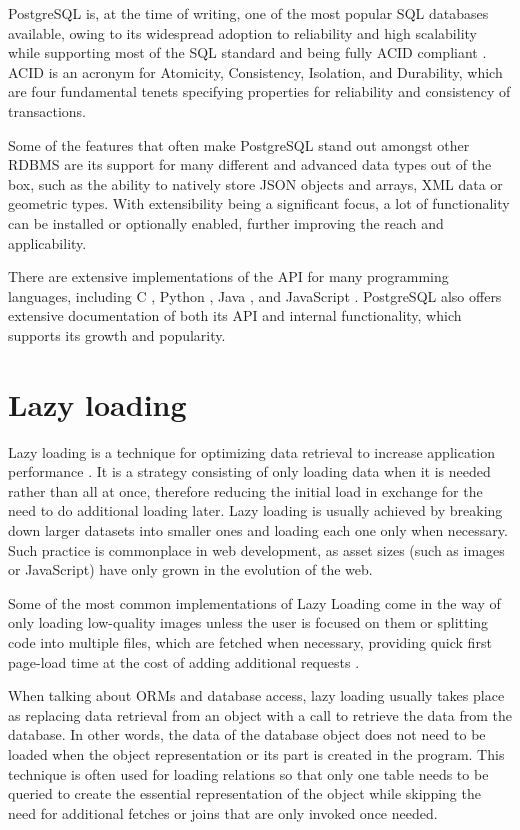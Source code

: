 PostgreSQL is, at the time of writing, one of the most popular SQL databases
available, owing to its widespread adoption to reliability and high scalability
while supporting most of the SQL standard and being fully ACID compliant
\cite{postgres-transaction}. ACID is an acronym for Atomicity, Consistency,
Isolation, and Durability, which are four fundamental tenets specifying
properties for reliability and consistency of transactions.

Some of the features that often make PostgreSQL stand out amongst other RDBMS
are its support for many different and advanced data types
\cite{postgres-datatypes} out of the box, such as the ability to natively store
JSON objects and arrays, XML data or geometric types. With extensibility being a
significant focus, a lot of functionality can be installed or optionally
enabled, further improving the reach and applicability.

There are extensive implementations of the API for many programming languages,
including C \cite{libpq}, Python \cite{psycopg2}, Java \cite{pgJDBC}, and
JavaScript \cite{node-postgres}. PostgreSQL also offers extensive documentation
of both its API and internal functionality, which supports its growth and
popularity.

\section*{Lazy loading}
Lazy loading is a technique for optimizing data retrieval to increase
application performance \cite{webPerformanceMDN}. It is a strategy consisting of
only loading data when it is needed rather than all at once, therefore reducing
the initial load in exchange for the need to do additional loading later. Lazy
loading is usually achieved by breaking down larger datasets into smaller ones
and loading each one only when necessary. Such practice is commonplace in web
development, as asset sizes (such as images or JavaScript) have only grown in
the evolution of the web.

Some of the most common implementations of Lazy Loading come in the way of only
loading low-quality images unless the user is focused on them or splitting code
into multiple files, which are fetched when necessary, providing quick first
page-load time at the cost of adding additional requests
\cite[p.~200]{fowler-patterns-2003}.

When talking about ORMs and database access, lazy loading usually takes place as
replacing data retrieval from an object with a call to retrieve the data from
the database. In other words, the data of the database object does not need to
be loaded when the object representation or its part is created in the program.
This technique is often used for loading relations so that only one table needs
to be queried to create the essential representation of the object while
skipping the need for additional fetches or joins that are only invoked once
needed.

